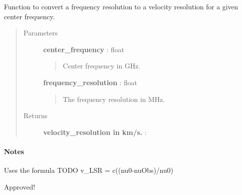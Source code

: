 \documentclass[a4paper,10pt,english]{sphinxmanual}
\begin{document}
\begin{fulllineitems}
\label{functions:astrolyze.functions.astro_functions.freq_to_vel_resolution}
Function to convert a frequency resolution to a velocity resolution
for a given center frequency.
\begin{quote}\begin{description}
\item[{Parameters }] \leavevmode
\textbf{center\_frequency} : float
\begin{quote}

Center frequency in GHz.
\end{quote}

\textbf{frequency\_resolution} : float
\begin{quote}

The frequency resolution in MHz.
\end{quote}

\item[{Returns }] \leavevmode
\textbf{velocity\_resolution in km/s.} :

\end{description}\end{quote}
\paragraph{Notes}

Uses the formula TODO v\_LSR = c((nu0-nuObs)/nu0)

Approved!

\end{fulllineitems}

\end{document}
